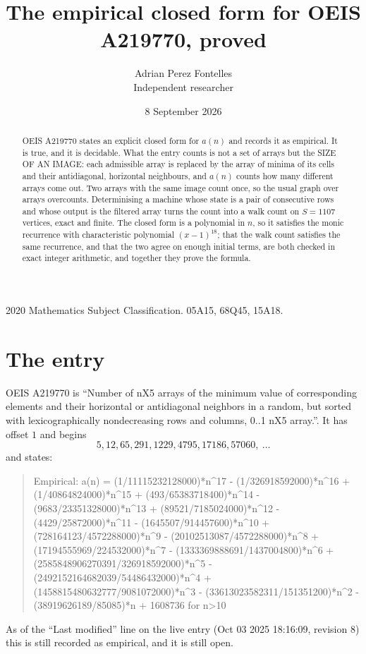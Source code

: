 \documentclass[11pt,a4paper]{article}
\title{The empirical closed form for OEIS A219770, proved}
\author{Adrian Perez Fontelles\\ \small Independent researcher}
\date{8 September 2026}
\theoremstyle{plain}
\theoremstyle{definition}
\begin{document}
\maketitle

\begin{abstract}
OEIS A219770 states an explicit closed form for $a(n)$ and records it as empirical. It is true, and
it is decidable. What the entry counts is not a set of arrays but the SIZE OF AN IMAGE: each
admissible array is replaced by the array of minima of its cells and their antidiagonal, horizontal neighbours,
and $a(n)$ counts how many different arrays come out. Two arrays with the same image count
once, so the usual graph over arrays overcounts. Determinising a machine whose state is a pair
of consecutive rows and whose output is the filtered array turns the count into a walk count on
$S=1107$ vertices, exact and finite. The closed form is a polynomial in $n$, so it satisfies the
monic recurrence with characteristic polynomial $(x-1)^{18}$; that the walk count
satisfies the same recurrence, and that the two agree on enough initial terms, are both checked
in exact integer arithmetic, and together they prove the formula.
\end{abstract}

\noindent\small 2020 Mathematics Subject Classification. 05A15, 68Q45, 15A18.\normalsize

\section{The entry}

OEIS A219770 is ``Number of nX5 arrays of the minimum value of corresponding elements and their horizontal or antidiagonal neighbors in a random, but sorted with lexicographically nondecreasing rows and columns, 0..1 nX5 array.''. It has offset $1$ and begins
\[
5, 12, 65, 291, 1229, 4795, 17186, 57060,\ \dots
\]
and states:
\begin{quote}
Empirical: a(n) = (1/11115232128000)*n\^{}17 - (1/326918592000)*n\^{}16 + (1/40864824000)*n\^{}15 + (493/65383718400)*n\^{}14 - (9683/23351328000)*n\^{}13 + (89521/7185024000)*n\^{}12 - (4429/25872000)*n\^{}11 - (1645507/914457600)*n\^{}10 + (728164123/4572288000)*n\^{}9 - (20102513087/4572288000)*n\^{}8 + (17194555969/224532000)*n\^{}7 - (1333369888691/1437004800)*n\^{}6 + (2585848906270391/326918592000)*n\^{}5 - (2492152164682039/54486432000)*n\^{}4 + (1458815480632777/9081072000)*n\^{}3 - (33613023582311/151351200)*n\^{}2 - (38919626189/85085)*n + 1608736 for n>10
\end{quote}
As of the ``Last modified'' line on the live entry (Oct 03 2025 18:16:09, revision 8)
this is still recorded as empirical, and it is still open.
\end{document}
